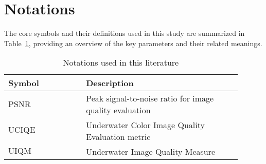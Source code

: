 \newpage
\section{Notations}
\setlength{\parindent}{2em} %


The core symbols and their definitions used in this study are summarized in Table~\ref{table:notations}, providing an overview of the key parameters and their related meanings.

\begin{table}[ht]
\centering
\caption{Notations used in this literature}
\renewcommand{\arraystretch}{1.5} %
\begin{tabular}{>{\centering\arraybackslash}p{0.3\linewidth} >{\centering\arraybackslash}p{0.6\linewidth}} %
\toprule %
\textbf{Symbol} & \textbf{Description} \\ 
\midrule %

$\text{PSNR}$    & Peak signal-to-noise ratio for image quality evaluation \\

$\text{UCIQE}$   & Underwater Color Image Quality Evaluation metric \\

$\text{UIQM}$    & Underwater Image Quality Measure \\


\bottomrule %
\end{tabular}
\label{table:notations}
\end{table}




